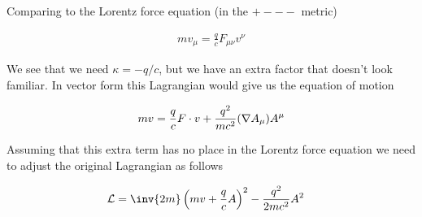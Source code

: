 \documentclass{article}
\begin{document}
Comparing to the Lorentz force equation (in the $+---$ metric)

\begin{align*}
m v_\mu = \frac{q}{c} F_{\mu\nu} v^\nu
\end{align*}

We see that we need $\kappa = -q/c$, but we have an extra factor that doesn't look familiar.  In vector form this Lagrangian would give us the
equation of motion

\begin{align*}
m v = \frac{q}{c} F \cdot v + \frac{q^2}{m c^2} (\nabla A_\mu) A^\mu
\end{align*}

Assuming that this extra term has no place in the Lorentz force equation we need to adjust the original Lagrangian as follows

\begin{align}
\LL
&= \inv{2 m}\left( m v + \frac{q}{c} A \right)^2 - \frac{q^2}{ 2 m c^2} A^2
\end{align}



\end{document}
